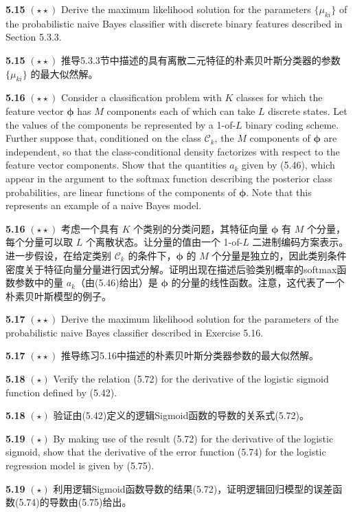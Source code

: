 \documentclass{article}
\begin{document}
\textbf{5.15} $(\star\star)$ Derive the maximum likelihood solution for the parameters $\{\mu_{ki}\}$ of the probabilistic naive Bayes classifier with discrete binary features described in Section 5.3.3.

\textbf{5.15} $(\star\star)$ 推导5.3.3节中描述的具有离散二元特征的朴素贝叶斯分类器的参数 $\{\mu_{ki}\}$ 的最大似然解。


\textbf{5.16} $(\star\star)$ Consider a classification problem with $K$ classes for which the feature vector $\boldsymbol{\phi}$ has $M$ components each of which can take $L$ discrete states. Let the values of the components be represented by a 1-of-$L$ binary coding scheme. Further suppose that, conditioned on the class $\mathcal{C}_k$, the $M$ components of $\boldsymbol{\phi}$ are independent, so that the class-conditional density factorizes with respect to the feature vector components. Show that the quantities $a_k$ given by (5.46), which appear in the argument to the softmax function describing the posterior class probabilities, are linear functions of the components of $\boldsymbol{\phi}$. Note that this represents an example of a naive Bayes model.

\textbf{5.16} $(\star\star)$ 考虑一个具有 $K$ 个类别的分类问题，其特征向量 $\boldsymbol{\phi}$ 有 $M$ 个分量，每个分量可以取 $L$ 个离散状态。让分量的值由一个 1-of-$L$ 二进制编码方案表示。进一步假设，在给定类别 $\mathcal{C}_k$ 的条件下，$\boldsymbol{\phi}$ 的 $M$ 个分量是独立的，因此类别条件密度关于特征向量分量进行因式分解。证明出现在描述后验类别概率的softmax函数参数中的量 $a_k$（由(5.46)给出）是 $\boldsymbol{\phi}$ 的分量的线性函数。注意，这代表了一个朴素贝叶斯模型的例子。


\textbf{5.17} $(\star\star)$ Derive the maximum likelihood solution for the parameters of the probabilistic naive Bayes classifier described in Exercise 5.16.

\textbf{5.17} $(\star\star)$ 推导练习5.16中描述的朴素贝叶斯分类器参数的最大似然解。


\textbf{5.18} $(\star)$ Verify the relation (5.72) for the derivative of the logistic sigmoid function defined by (5.42).

\textbf{5.18} $(\star)$ 验证由(5.42)定义的逻辑Sigmoid函数的导数的关系式(5.72)。


\textbf{5.19} $(\star)$ By making use of the result (5.72) for the derivative of the logistic sigmoid, show that the derivative of the error function (5.74) for the logistic regression model is given by (5.75).

\textbf{5.19} $(\star)$ 利用逻辑Sigmoid函数导数的结果(5.72)，证明逻辑回归模型的误差函数(5.74)的导数由(5.75)给出。
\end{document}
